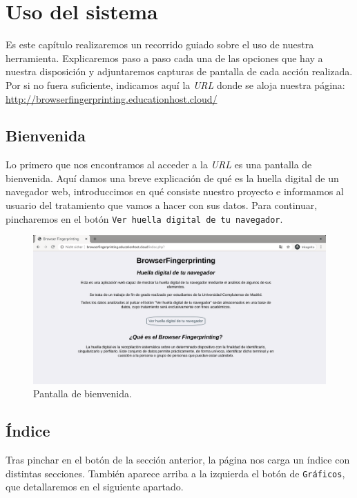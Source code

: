 \chapter{Uso del sistema}
\label{ch:usodelsistema}
Es este capítulo realizaremos un recorrido guiado sobre el uso de nuestra herramienta. Explicaremos paso a paso cada una de las opciones que hay a nuestra disposición y adjuntaremos capturas de pantalla de cada acción realizada. Por si no fuera suficiente, indicamos aquí la \textit{URL} donde se aloja nuestra página: \url{http://browserfingerprinting.educationhost.cloud/}

\section{Bienvenida}

Lo primero que nos encontramos al acceder a la \textit{URL} es una pantalla de bienvenida. Aquí damos una breve explicación de qué es la huella digital de un navegador web, introduccimos en qué consiste nuestro proyecto e informamos al usuario del tratamiento que vamos a hacer con sus datos. Para continuar, pincharemos en el botón \texttt{Ver huella digital de tu navegador}.

\begin{figure}[H]
	\centering
	\includegraphics[width=1\textwidth]{Images/wellcome.png}
	\caption{Pantalla de bienvenida.}
	\label{fig:wellcome}
\end{figure}

\section{Índice}

Tras pinchar en el botón de la sección anterior, la página nos carga un índice con distintas secciones. También aparece arriba a la izquierda el botón de \texttt{Gráficos}, que detallaremos en el siguiente apartado.

